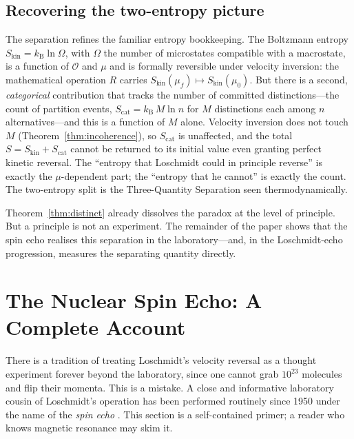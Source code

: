 \documentclass[11pt,a4paper]{article}
\theoremstyle{thmstyle}
\theoremstyle{definition}
\theoremstyle{remark}
\newcommand{\kB}{k_{\mathrm{B}}}
\newcommand{\Count}{M}
\newcommand{\Obs}{\mathcal{O}}
\newcommand{\Mic}{\mu}
\begin{document}
\subsection{Recovering the two-entropy picture}
\label{sec:two-entropy}

The separation refines the familiar entropy bookkeeping. The Boltzmann
entropy $S_{\mathrm{kin}}=\kB\ln\Omega$, with $\Omega$ the number of
microstates compatible with a macrostate, is a function of $\Obs$ and
$\Mic$ and is formally reversible under velocity inversion: the
mathematical operation $R$ carries
$S_{\mathrm{kin}}(\Mic_{f})\mapsto S_{\mathrm{kin}}(\Mic_{0})$. But there
is a second, \emph{categorical} contribution that tracks the number of
committed distinctions---the count of partition events,
$S_{\mathrm{cat}}=\kB\,\Count\ln n$ for $\Count$ distinctions each among
$n$ alternatives---and this is a function of $\Count$ alone. Velocity
inversion does not touch $\Count$ (Theorem~\ref{thm:incoherence}), so
$S_{\mathrm{cat}}$ is unaffected, and the total
$S=S_{\mathrm{kin}}+S_{\mathrm{cat}}$ cannot be returned to its initial
value even granting perfect kinetic reversal. The ``entropy that
Loschmidt could in principle reverse'' is exactly the $\Mic$-dependent
part; the ``entropy that he cannot'' is exactly the count. The
two-entropy split is the Three-Quantity Separation seen
thermodynamically.

Theorem~\ref{thm:distinct} already dissolves the paradox at the level of
principle. But a principle is not an experiment. The remainder of the
paper shows that the spin echo realises this separation in the
laboratory---and, in the Loschmidt-echo progression, measures the
separating quantity directly.

\section{The Nuclear Spin Echo: A Complete Account}
\label{sec:nmr}

There is a tradition of treating Loschmidt's velocity reversal as a
thought experiment forever beyond the laboratory, since one cannot grab
$10^{23}$ molecules and flip their momenta. This is a mistake. A close
and informative laboratory cousin of Loschmidt's operation has been
performed routinely since 1950 under the name of the \emph{spin echo}
\citep{hahn1950}. This section is a self-contained primer; a reader who
knows magnetic resonance may skim it.
\end{document}
